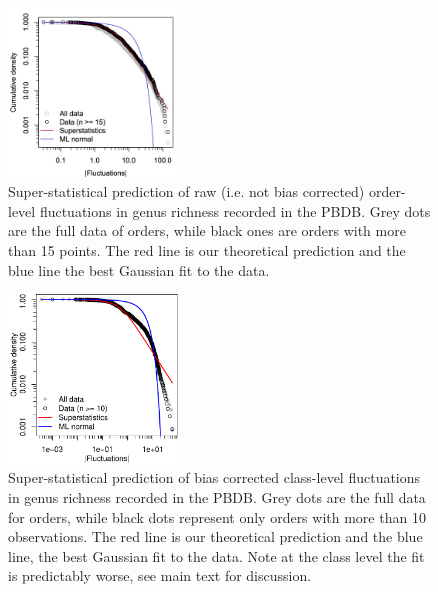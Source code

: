 \documentclass[12pt]{article}
\begin{document}
\begin{figure}[!hp]
  \centering
  \includegraphics[width=0.4\textwidth]{figs/figSupp_pbdbRaw_Px.jpg}
  \caption[Super-statistical prediction of raw data]{Super-statistical
    prediction of raw (i.e. not bias corrected) order-level
    fluctuations in genus richness recorded in the PBDB. Grey dots
    are the full data of orders, while black ones are orders with more
    than 15 points. The red line is our theoretical prediction and the
    blue line the best Gaussian fit to the data.}
  \label{fig:supp_rawPBDB_Px}
\end{figure}

\begin{figure}[!hp]
  \centering
  \includegraphics[width=0.4\textwidth]{figs/figSupp_Px_cls.pdf}
  \caption[Super-statistical prediction of bias corrected class-level
  data]{Super-statistical prediction of bias corrected class-level
    fluctuations in genus richness recorded in the PBDB. Grey dots
    are the full data for orders, while black dots represent only
    orders with more than 10 observations. The red line is our
    theoretical prediction and the blue line, the best Gaussian fit to
    the data. Note at the class level the fit is predictably worse,
    see main text for discussion.}
  \label{fig:supp_PBDB_Px_cls}
\end{figure}
\end{document}
